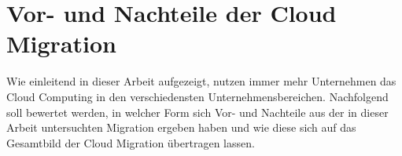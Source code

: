 




\pagebreak

\section{Vor- und Nachteile der Cloud Migration}
Wie einleitend in dieser Arbeit aufgezeigt, nutzen immer mehr Unternehmen das Cloud Computing in den verschiedensten Unternehmensbereichen. Nachfolgend soll bewertet werden, in welcher Form sich Vor- und Nachteile aus der in dieser Arbeit untersuchten Migration ergeben haben und wie diese sich auf das Gesamtbild der Cloud Migration übertragen lassen.

